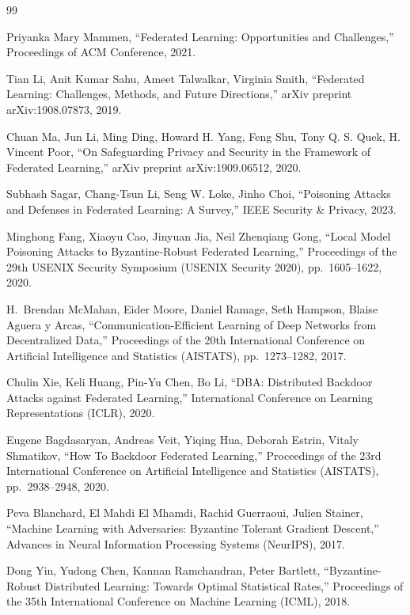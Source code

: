 \documentclass[a4j, twocolumn, dvipdfmx]{jsarticle}
\begin{document}
\begin{thebibliography}{99}

Priyanka Mary Mammen,
``Federated Learning: Opportunities and Challenges,''
Proceedings of ACM Conference, 2021.

Tian Li, Anit Kumar Sahu, Ameet Talwalkar, Virginia Smith,
``Federated Learning: Challenges, Methods, and Future Directions,''
arXiv preprint arXiv:1908.07873, 2019.

Chuan Ma, Jun Li, Ming Ding, Howard H. Yang, Feng Shu, Tony Q. S. Quek, H. Vincent Poor,
``On Safeguarding Privacy and Security in the Framework of Federated Learning,''
arXiv preprint arXiv:1909.06512, 2020.

Subhash Sagar, Chang-Tsun Li, Seng W. Loke, Jinho Choi,
``Poisoning Attacks and Defenses in Federated Learning: A Survey,''
IEEE Security \& Privacy, 2023.

Minghong Fang, Xiaoyu Cao, Jinyuan Jia, Neil Zhenqiang Gong,
``Local Model Poisoning Attacks to Byzantine-Robust Federated Learning,''
Proceedings of the 29th USENIX Security Symposium (USENIX Security 2020),
pp.~1605--1622, 2020.

H.~Brendan McMahan, Eider Moore, Daniel Ramage, Seth Hampson, Blaise Aguera y Arcas,
``Communication-Efficient Learning of Deep Networks from Decentralized Data,''
Proceedings of the 20th International Conference on Artificial Intelligence and Statistics (AISTATS),
pp.~1273--1282, 2017.

Chulin Xie, Keli Huang, Pin-Yu Chen, Bo Li,
``DBA: Distributed Backdoor Attacks against Federated Learning,''
International Conference on Learning Representations (ICLR), 2020.

Eugene Bagdasaryan, Andreas Veit, Yiqing Hua, Deborah Estrin, Vitaly Shmatikov,
``How To Backdoor Federated Learning,''
Proceedings of the 23rd International Conference on Artificial Intelligence and Statistics (AISTATS),
pp.~2938--2948, 2020.

Peva Blanchard, El Mahdi El Mhamdi, Rachid Guerraoui, Julien Stainer,
``Machine Learning with Adversaries: Byzantine Tolerant Gradient Descent,''
Advances in Neural Information Processing Systems (NeurIPS), 2017.

Dong Yin, Yudong Chen, Kannan Ramchandran, Peter Bartlett,
``Byzantine-Robust Distributed Learning: Towards Optimal Statistical Rates,''
Proceedings of the 35th International Conference on Machine Learning (ICML), 2018.


\end{thebibliography}
\end{document}
